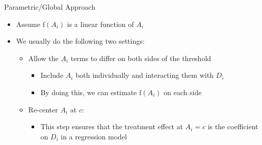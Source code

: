 \documentclass[hyperref={pdfpagelabels=false}]{beamer}
\begin{document}
\begin{frame}{Parametric/Global Approach}{}
	\begin{itemize}
		
		\item Assume $\mathrm{f}(A_i)$ is a linear function of $A_{i}$
		\vspace{0.2cm}
		\item We usually do the following two settings:
		\vspace{0.2cm}
			\begin{itemize}
		\item[1] Allow the $A_i$ terms to differ on both sides of the threshold 
				\vspace{0.2cm}
			\begin{itemize}
			\item Include $A_{i}$ both individually and interacting them with $D_i$
			\vspace{0.2cm}
			\item By doing this, we can estimate $\mathrm{f}(A_i)$ on each side
						\vspace{0.2cm}
		\end{itemize}
			\item[2] Re-center $A_{i}$ at $c$: 
		\vspace{0.2cm}
		\begin{itemize}
			\item This step ensures that the treatment effect at $A_i=c$ is the coefficient on $D_i$ in a regression model 
		\end{itemize}
		
			\end{itemize}
	
	
		
		
		
		
		
		
	\end{itemize}
\end{frame}
\end{document}
